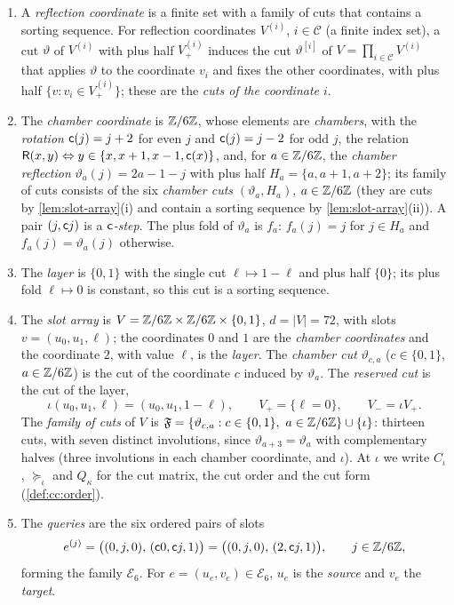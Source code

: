 \begin{definition}\label{def:slot-array}
\leavevmode
\begin{enumerate}[label=(\alph*)]
\item A \emph{reflection coordinate} is a finite set with a family of cuts that
 contains a sorting sequence. For reflection coordinates $V^{(i)}$,
 $i\in\mathcal C$ (a finite index set), a cut $\vartheta$ of $V^{(i)}$ with plus
 half $V^{(i)}_+$ induces the cut $\vartheta^{[i]}$ of $V=\prod_{i\in\mathcal C}V^{(i)}$
 that applies $\vartheta$ to the coordinate $v_i$ and fixes the other
 coordinates, with plus half $\{v:v_i\in V^{(i)}_+\}$; these are the \emph{cuts
 of the coordinate $i$}.
\item The \emph{chamber coordinate} is $\mathbb Z/6\mathbb Z$, whose elements are
 \emph{chambers}, with the \emph{rotation} $\mathsf c(j)=j+2$ for even $j$ and
 $\mathsf c(j)=j-2$ for odd $j$, the relation
 $\mathsf R(x,y)\Leftrightarrow y\in\{x,x+1,x-1,\mathsf c(x)\}$, and, for $a\in\mathbb Z/6\mathbb Z$,
 the \emph{chamber reflection} $\vartheta_a(j)=2a-1-j$ with plus half
 $H_a=\{a,a+1,a+2\}$; its family of cuts consists of the six \emph{chamber
 cuts} $(\vartheta_a,H_a)$, $a\in\mathbb Z/6\mathbb Z$ (they are cuts by
 \cref{lem:slot-array}(i) and contain a sorting sequence by
 \cref{lem:slot-array}(ii)). A pair $(j,\mathsf c j)$ is a \emph{$\mathsf c$-step}. The
 plus fold of $\vartheta_a$ is $f_a$: $f_a(j)=j$ for $j\in H_a$ and
 $f_a(j)=\vartheta_a(j)$ otherwise.
\item The \emph{layer} is $\{0,1\}$ with the single cut $\ell\mapsto1-\ell$ and
 plus half $\{0\}$; its plus fold $\ell\mapsto0$ is constant, so this cut is a
 sorting sequence.
\item The \emph{slot array} is $V=\mathbb Z/6\mathbb Z\times\mathbb Z/6\mathbb Z\times\{0,1\}$, $d=|V|=72$,
 with slots $v=(u_0,u_1,\ell)$; the coordinates $0$ and $1$ are the
 \emph{chamber coordinates} and the coordinate $2$, with value $\ell$, is the
 \emph{layer}. The \emph{chamber cut} $\vartheta_{c,a}$ ($c\in\{0,1\}$,
 $a\in\mathbb Z/6\mathbb Z$) is the cut of the coordinate $c$ induced by $\vartheta_a$. The
 \emph{reserved cut} is the cut of the layer,
 \[
  \iota(u_0,u_1,\ell)=(u_0,u_1,1-\ell),\qquad V_+=\{\ell=0\},\qquad V_-=\iota V_+ .
 \]
 The \emph{family of cuts} of $V$ is
 $\mathfrak F=\{\vartheta_{c,a}:c\in\{0,1\},\ a\in\mathbb Z/6\mathbb Z\}\cup\{\iota\}$: thirteen cuts, with seven distinct
 involutions, since $\vartheta_{a+3}=\vartheta_a$ with complementary halves
 (three involutions in each chamber coordinate, and $\iota$). At
 $\iota$ we write $C_\iota$, $\succeq_\iota$ and $Q_\kappa$ for the cut matrix,
 the cut order and the cut form (\cref{def:cc:order}).
\item The \emph{queries} are the six ordered pairs of slots
 \[
  e^{(j)}=\big((0,j,0),\,(\mathsf c0,\mathsf c j,1)\big)=\big((0,j,0),\,(2,\mathsf c j,1)\big),
  \qquad j\in\mathbb Z/6\mathbb Z,
 \]
 forming the family $\mathcal E_6$. For $e=(u_e,v_e)\in\mathcal E_6$, $u_e$ is
 the \emph{source} and $v_e$ the \emph{target}.
\end{enumerate}
\end{definition}

